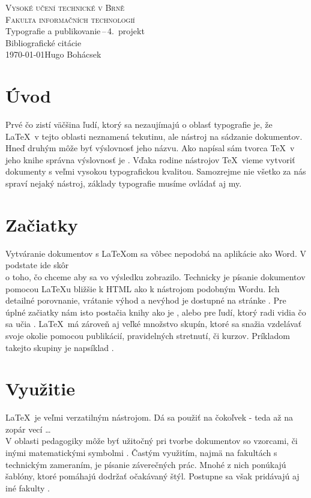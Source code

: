 \documentclass[a4paper, 11pt]{article}
\begin{document}
\begin{titlepage}
	\begin{center}
		{\Huge \textsc{Vysoké učení technické v Brně}\\}
		{\huge \textsc{Fakulta informačních technologií}\\}
		{\LARGE Typografie a publikovanie\,--\,4.\ projekt\\}
		{\Huge Bibliografické citácie\\}
		{\Large \today \hfill Hugo Bohácsek}
	\end{center}
\end{titlepage}

\section{Úvod}
Prvé čo zistí väčšina ľudí, ktorý sa nezaujímajú o oblasť typografie je, že \LaTeX\ v tejto oblasti neznamená tekutinu, ale nástroj na sádzanie dokumentov. Hneď druhým  môže byť výslovnosť jeho názvu. Ako napísal sám tvorca \TeX\ v jeho knihe \cite{knuth1986texbook} správna výslovnosť je . Vďaka rodine nástrojov \TeX\ vieme vytvoriť dokumenty s veľmi vysokou typografickou kvalitou. Samozrejme nie všetko za nás spraví nejaký nástroj, základy typografie musíme ovládať aj my.

\section{Začiatky}
Vytváranie dokumentov s \LaTeX om sa vôbec nepodobá na aplikácie ako Word. V podstate ide skôr\\o {} toho, čo chceme aby sa vo výsledku zobrazilo. Technicky je písanie dokumentov pomocou \LaTeX u bližšie k  HTML ako k nástrojom podobným Wordu. Ich detailné porovnanie, vrátanie výhod a nevýhod je dostupné na stránke \cite{porovnanie2007}. Pre úplné začiatky nám isto postačia knihy ako je \cite{rybička1995latex}, alebo pre ľudí, ktorý radi vidia čo sa učia \cite{goossens1997latex}. \LaTeX\ má zároveň aj veľké množstvo skupín, ktoré sa snažia vzdelávať svoje okolie pomocou publikácií, pravidelných stretnutí, či kurzov. Príkladom takejto skupiny je napsíklad  \cite{DuckBoat}.
\section{Využitie}
\LaTeX\ je veľmi verzatilným nástrojom. Dá sa použiť na čokoľvek - teda až na zopár vecí \dots \cite{article2010}\\V oblasti pedagogiky môže byť užitočný pri tvorbe dokumentov so vzorcami, či inými matematickými symbolmi \cite{online2009}. Častým využitím, najmä na fakultách s technickým zameraním, je písanie záverečných prác. Mnohé z nich ponúkajú šablóny, ktoré pomáhajú dodržať očakávaný štýl. Postupne sa však pridávajú aj iné fakulty \cite{Bartlik2017thesis}.
\end{document}
